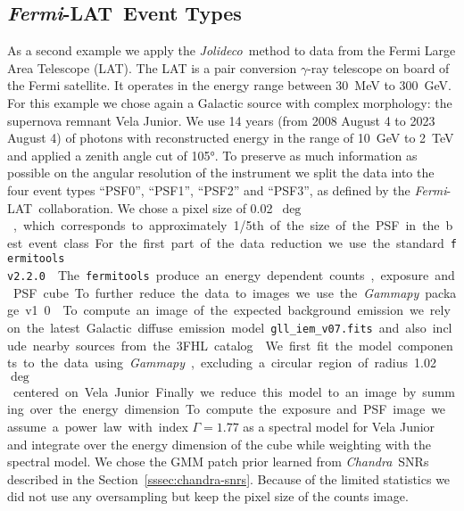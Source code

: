 \documentclass[twocolumn]{aastex631}
\newcommand{\chandra}{\textit{Chandra}~}
\newcommand{\fermi}{\textit{Fermi}-LAT~}
\newcommand{\jolideco}{\textit{Jolideco}~}
\newcommand{\gammaray}{$\gamma$-ray\xspace}
\begin{document}

    \subsection{\fermi Event Types}
    As a second example we apply the \jolideco method to data from the Fermi Large Area Telescope (LAT). The LAT is a pair conversion \gammaray telescope on board of the Fermi satellite. It operates in the energy range between \qty[mode = text]{30}{MeV} to  \qty[mode = text]{300}{GeV}. For this example we chose again a Galactic source with complex morphology: the supernova remnant Vela Junior. We use 14 years (from 2008 August 4 to 2023 August 4) of  photons with reconstructed energy in the range of \qty[mode = text]{10}{GeV} to  \qty[mode = text]{2}{TeV} and applied a zenith angle cut of \ang{105}. To preserve as much information as possible on the angular resolution of the instrument we split the data into the four event types \enquote{PSF0}, \enquote{PSF1}, \enquote{PSF2} and \enquote{PSF3}, as defined by the \fermi collaboration. We chose a pixel size of \qty[mode = text]{0.02}{$\deg$}, which corresponds to approximately 1/5th of the size of the PSF in the best event class. For the first part of the data reduction we use the standard \texttt{fermitools v2.2.0} \cite{}.
    
    The \texttt{fermitools} produce an energy dependent counts, exposure and PSF cube. To further reduce the data to images we use the \textit{Gammapy} package v1.0 \citep{GammapyZenodov1.0.1, Donath2023}. To compute an image of the expected background emission we rely on the latest Galactic diffuse emission model \texttt{gll\_iem\_v07.fits} and also include nearby sources from the 3FHL catalog \citep{Ajello2017}. We first fit the model components to the data using \textit{Gammapy}, excluding a circular region of radius \qty[mode = text]{1.02}{$\deg$} centered on Vela Junior. Finally we reduce this model to an image by summing over the energy dimension. To compute the exposure and PSF image we assume a power law with index $\Gamma=1.77$ \citep{Ajello2017} as a spectral model for Vela Junior and integrate over the energy dimension of the cube while weighting with the spectral model. We chose the GMM patch prior learned from \chandra SNRs described in the Section~\ref{sssec:chandra-snrs}. Because of the limited statistics we did not use any oversampling but keep the pixel size of the counts image. 
    
\end{document}
